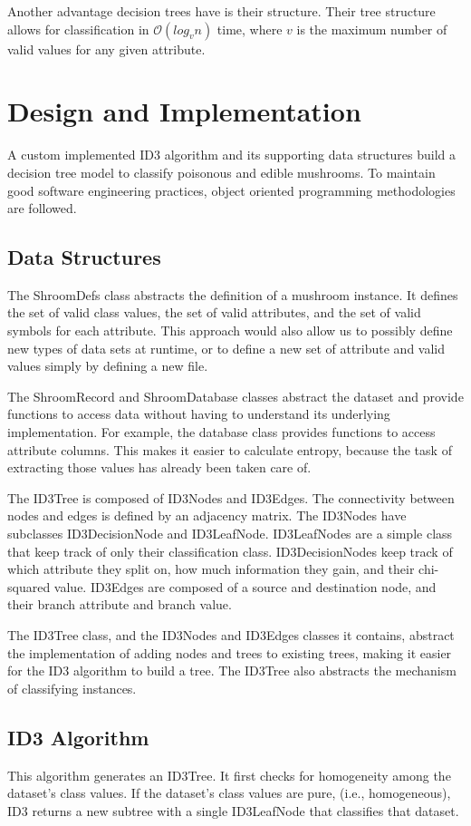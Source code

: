 \documentclass{IEEEtran}
\begin{document}
Another advantage decision trees have is their structure. Their tree
structure allows for classification in $\mathcal{O}(log_{v}n)$ time,
where $v$ is the maximum number of valid values for any given attribute.


\section{Design and Implementation}
A custom implemented ID3 algorithm and its supporting data structures
build a decision tree model to classify poisonous and edible
mushrooms. To maintain good software engineering practices, object
oriented programming methodologies are followed.


\subsection{Data Structures}
The ShroomDefs class abstracts the definition of a mushroom
instance. It defines the set of valid class values, the set of valid
attributes, and the set of valid symbols for each attribute. This
approach would also allow us to possibly define new types of data sets
at runtime, or to define a new set of attribute and valid values
simply by defining a new file. 

The ShroomRecord and ShroomDatabase classes abstract the dataset and
provide  functions to access data without having to understand its
underlying implementation. For example, the database class provides
functions to access attribute columns. This makes it easier to
calculate entropy, because the task of extracting those values has
already been taken care of. 

The ID3Tree is composed of ID3Nodes and ID3Edges. The connectivity
between nodes and edges is defined by an adjacency matrix. The
ID3Nodes have subclasses ID3DecisionNode and ID3LeafNode. ID3LeafNodes
are a simple class that keep track of only their classification
class. ID3DecisionNodes keep track of which attribute they split on,
how much information they gain, and their chi-squared value. ID3Edges
are composed of a source and destination node, and their branch
attribute and branch value.

The ID3Tree class, and the ID3Nodes and ID3Edges classes it contains,
abstract the implementation of adding nodes and trees to existing
trees, making it easier for the ID3 algorithm to build a tree. The
ID3Tree also abstracts the mechanism of classifying instances.


\subsection{ID3 Algorithm}
This algorithm generates an ID3Tree. It first checks for homogeneity
among the dataset's class values. If the dataset's class values are
pure, (i.e., homogeneous), ID3 returns a new subtree with a single
ID3LeafNode that classifies that dataset.
\end{document}
